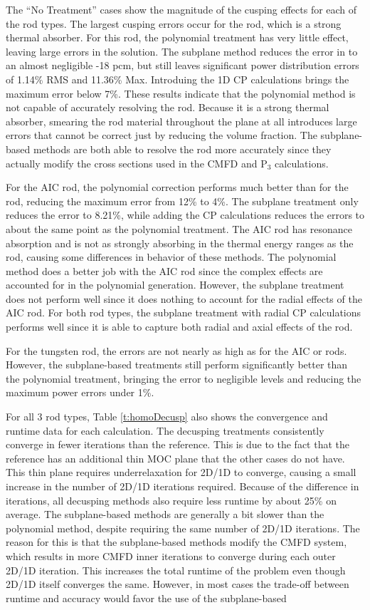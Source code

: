 The ``No Treatment'' cases show the magnitude of the cusping effects for each of the rod types.  The largest cusping errors occur for the \bfc{} rod, which is a strong thermal absorber.  For this rod, the polynomial treatment has very little effect, leaving large errors in the solution.  The subplane method reduces the error in \keff{} to an almost negligible -18 pcm, but still leaves significant power distribution errors of 1.14\% RMS and 11.36\% Max.  Introduing the 1D CP calculations brings the maximum error below 7\%.  These results indicate that the polynomial method is not capable of accurately resolving the \bfc{} rod.  Because it is a strong thermal absorber, smearing the rod material throughout the plane at all introduces large errors that cannot be correct just by reducing the volume fraction.  The subplane-based methods are both able to resolve the rod more accurately since they actually modify the cross sections used in the CMFD and P$_3$ calculations.

For the AIC rod, the polynomial correction performs much better than for the \bfc{} rod, reducing the maximum error from 12\% to 4\%.  The subplane treatment only reduces the error to 8.21\%, while adding the CP calculations reduces the errors to about the same point as the polynomial treatment.  The AIC rod has resonance absorption and is not as strongly absorbing in the thermal energy ranges as the \bfc{} rod, causing some differences in behavior of these methods.  The polynomial method does a better job with the AIC rod since the complex effects are accounted for in the polynomial generation.  However, the subplane treatment does not perform well since it does nothing to account for the radial effects of the AIC rod.  For both rod types, the subplane treatment with radial CP calculations performs well since it is able to capture both radial and axial effects of the rod.

For the tungsten rod, the errors are not nearly as high as for the AIC or \bfc{} rods.  However, the subplane-based treatments still perform significantly better than the polynomial treatment, bringing the \keff{} error to negligible levels and reducing the maximum power errors under 1\%.

For all 3 rod types, Table \ref{t:homoDecusp} also shows the convergence and runtime data for each calculation.  The decusping treatments consistently converge in fewer iterations than the reference.  This is due to the fact that the reference has an additional thin MOC plane that the other cases do not have.  This thin plane requires underrelaxation for 2D/1D to converge, causing a small increase in the number of 2D/1D iterations required.  Because of the difference in iterations, all decusping methods also require less runtime by about 25\% on average.  The subplane-based methods are generally a bit slower than the polynomial method, despite requiring the same number of 2D/1D iterations.  The reason for this is that the subplane-based methods modify the CMFD system, which results in more CMFD inner iterations to converge during each outer 2D/1D iteration.  This increases the total runtime of the problem even though 2D/1D itself converges the same.  However, in most cases the trade-off between runtime and accuracy would favor the use of the subplane-based 

